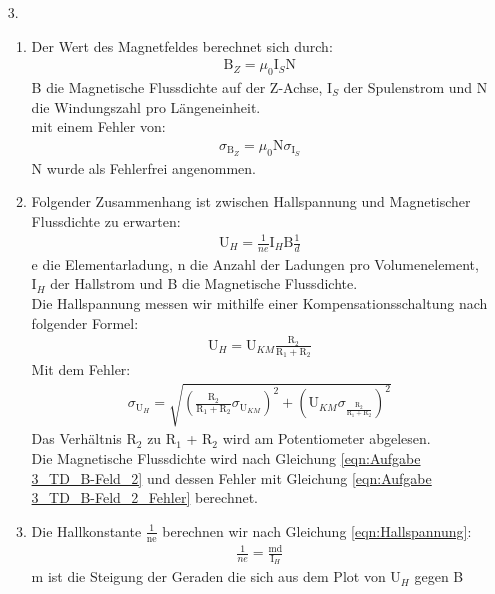 \documentclass[12pt]{scrartcl}
\begin{document}
\begin{enumerate}
\item[3.]
\begin{enumerate}
\item
Der Wert des Magnetfeldes berechnet sich durch:
\begin{align}
 \text{B}_Z = \mu_0 \text{I}_S \text{N}
 \label{eqn:Aufgabe 3_TD_B-Feld_2}
\end{align}
B die Magnetische Flussdichte auf der Z-Achse, I$_S$ der Spulenstrom und N die Windungszahl pro Längeneinheit.\\
mit einem Fehler von:
\begin{align}
\sigma_{\text{B}_Z} = \mu_0 \text{N} \sigma_{\text{I}_S}
\label{eqn:Aufgabe 3_TD_B-Feld_2_Fehler}
\end{align}
N wurde als Fehlerfrei angenommen.\\
\item
Folgender Zusammenhang ist zwischen Hallspannung und Magnetischer Flussdichte zu erwarten:
\begin{align}
\text{U}_H = \frac{1}{ne} \text{I}_H \text{B} \frac{1}{d}
\label{eqn:Hallspannung}
\end{align}
e die Elementarladung, n die Anzahl der Ladungen pro Volumenelement, I$_H$ der Hallstrom und B die Magnetische Flussdichte.\\
Die Hallspannung messen wir mithilfe einer Kompensationsschaltung nach folgender Formel:
\begin{align}
\text{U}_H = \text{U}_{KM} \frac{\text{R}_2}{\text{R}_1+\text{R}_2}
\label{eqn:U_H}
\end{align}
Mit dem Fehler:
\begin{align}
\sigma_{\text{U}_H} = \sqrt{
\left(\frac{\text{R}_2}{\text{R}_1+\text{R}_2}\sigma_{\text{U}_{KM}}\right)^2+
\left(\text{U}_{KM}\sigma_{\frac{\text{R}_2}{\text{R}_1+\text{R}_2}}\right)^2}
\label{eqn:U_H_Fehler}
\end{align}
Das Verhältnis R$_2$ zu R$_1$ + R$_2$ wird am Potentiometer abgelesen.\\
Die Magnetische Flussdichte wird nach Gleichung \ref{eqn:Aufgabe 3_TD_B-Feld_2} und dessen Fehler mit Gleichung \ref{eqn:Aufgabe 3_TD_B-Feld_2_Fehler} berechnet.
\item
Die Hallkonstante $\frac{1}{\text{ne}}$ berechnen wir nach Gleichung \ref{eqn:Hallspannung}:
\begin{align*}
\frac{1}{ne} = \frac{\text{m} \text{d}}
{\text{I}_H}
\end{align*}
m ist die Steigung der Geraden die sich aus dem Plot von U$_H$ gegen B

\end{enumerate}
\end{enumerate}
\end{document}
